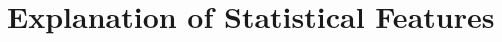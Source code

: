 \documentclass[11pt]{amsart}
\theoremstyle{definition}                  %
\theoremstyle{remark}                       %
\numberwithin{equation}{section}
\begin{document}

\appendix
\newcommand{\AppFigW}{0.48\textwidth}

\section{Explanation of Statistical Features}
\label{app:stat_features}
\end{document}
